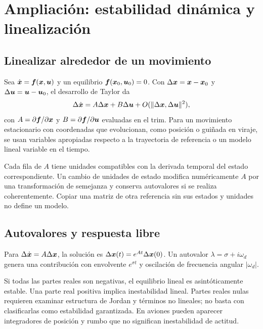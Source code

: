 \chapter{Ampliación: estabilidad dinámica y linealización}\label{ch:dynamic}


\section{Linealizar alrededor de un movimiento}
Sea $\dot{\boldsymbol{x}}=\boldsymbol{f}(\boldsymbol{x},\boldsymbol{u})$ y un equilibrio $\boldsymbol{f}(\boldsymbol{x}_0,\boldsymbol{u}_0)=0$. Con $\Delta\boldsymbol{x}=\boldsymbol{x}-\boldsymbol{x}_0$ y $\Delta\boldsymbol{u}=\boldsymbol{u}-\boldsymbol{u}_0$, el desarrollo de Taylor da
\begin{equation}
\Delta\dot{\boldsymbol{x}}=A\Delta\boldsymbol{x}+B\Delta\boldsymbol{u}+O(\|\Delta\boldsymbol{x},\Delta\boldsymbol{u}\|^2),
\end{equation}
con $A=\partial\boldsymbol{f}/\partial\boldsymbol{x}$ y $B=\partial\boldsymbol{f}/\partial\boldsymbol{u}$ evaluadas en el trim. Para un movimiento estacionario con coordenadas que evolucionan, como posición o guiñada en viraje, se usan variables apropiadas respecto a la trayectoria de referencia o un modelo lineal variable en el tiempo.

Cada fila de $A$ tiene unidades compatibles con la derivada temporal del estado correspondiente. Un cambio de unidades de estado modifica numéricamente $A$ por una transformación de semejanza y conserva autovalores si se realiza coherentemente. Copiar una matriz de otra referencia sin sus estados y unidades no define un modelo.

\section{Autovalores y respuesta libre}
Para $\Delta\dot{\boldsymbol{x}}=A\Delta\boldsymbol{x}$, la solución es $\Delta\boldsymbol{x}(t)=e^{At}\Delta\boldsymbol{x}(0)$. Un autovalor $\lambda=\sigma+i\omega_d$ genera una contribución con envolvente $e^{\sigma t}$ y oscilación de frecuencia angular $|\omega_d|$.

Si todas las partes reales son negativas, el equilibrio lineal es asintóticamente estable. Una parte real positiva implica inestabilidad lineal. Partes reales nulas requieren examinar estructura de Jordan y términos no lineales; no basta con clasificarlas como estabilidad garantizada. En aviones pueden aparecer integradores de posición y rumbo que no significan inestabilidad de actitud.

